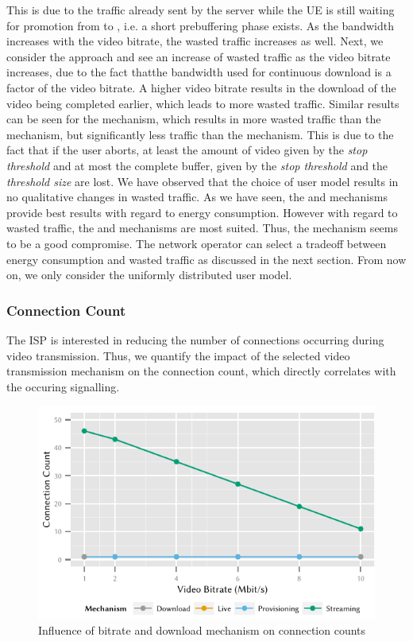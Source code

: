 This is due to the traffic already sent by the server while the \gls{UE} is still waiting for promotion from \rrcidle to \rrcconnected, i.e. a short prebuffering phase exists.
As the bandwidth increases with the video bitrate, the wasted traffic increases as well.
Next, we consider the \serviceprovisioning approach and see an increase of wasted traffic as the video bitrate increases, due to the fact thatthe bandwidth used for continuous download is a factor of the video bitrate.
A higher video bitrate results in the download of the video being completed earlier, which leads to more wasted traffic.
Similar results can be seen for the \streaming mechanism, which results in more wasted traffic than the \live mechanism, but significantly less traffic than the \serviceprovisioning mechanism.
This is due to the fact that if the user aborts, at least the amount of video given by the \emph{stop threshold} \bufferlower and at most the complete buffer, given by the \emph{stop threshold} and the \emph{threshold size} are lost.
We have observed that the choice of user model results in no qualitative changes in wasted traffic.
As we have seen, the \download and \streaming mechanisms provide best results with regard to energy consumption.
However with regard to wasted traffic, the \live and \streaming mechanisms are most suited.
Thus, the \streaming mechanism seems to be a good compromise.
The network operator can select a tradeoff between energy consumption and wasted traffic as discussed in the next section.
From now on, we only consider the uniformly distributed user model.

\subsubsection*{Connection Count}\label{sec:application:lte_video:connection_count}
The \gls{ISP} is interested in reducing the number of connections occurring during video transmission.
Thus, we quantify the impact of the selected video transmission mechanism on the connection count, which directly correlates with the occuring signalling.
\begin{figure}
  \centering
  \includegraphics{application/lte_video/numerical_evaluation/figures/bitrate2connections}
  \caption{Influence of bitrate and download mechanism on connection counts}
  \label{fig:application:lte_video:numerical_evaluation:energy_consumption:bitrate2connections}
\end{figure}

